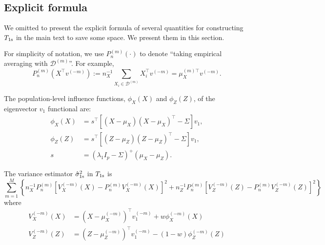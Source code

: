 \documentclass[11pt]{article}
\begin{document}
\subsection{Explicit formula}\label{app: explicit formula}

We omitted to present the explicit formula of several quantities for constructing $T_{\rm 1s}$ in the main text to save some space. We present them in this section.

For simplicity of notation, we use $P_n^{(m)}(\cdot)$ to denote ``taking empirical averaging with $\mathcal{D}^{(m)}$''. For example,
\begin{equation*}
    P_n^{(m)} (X^\top v^{(-m)}) := n_X^{-1}\sum_{X_i\in\mathcal{D}^{(m)}} X_i^\top v^{(-m)} = \mu_X^{(m)\top}v^{(-m)}.
\end{equation*}

The population-level influence functions, $\phi_X(X)$ and $\phi_Z(Z)$, of the eigenvector $v_1$ functional  are:
\begin{equation}\label{eq: define_true_influence}
    \begin{aligned}
\phi_X(X) & =s^{\top}\left[\left(X-\mu_X\right)\left(X-\mu_X \right)^{\top}-\Sigma \right] v_1 , \\
\phi_Z (Z) & =s^{ \top}\left[\left(Z-\mu_Z \right)\left(Z-\mu_Z \right)^{\top}-\Sigma \right] v_1 , \\
s  & =\left(\lambda_1 I_p-\Sigma \right)^{+}\left(\mu_X -\mu_Z \right) .
\end{aligned}
\end{equation}

The variance estimator $\hat{\sigma}_{\rm 1s}^2$ in $T_{\rm 1s}$ is 
\begin{equation}\label{eq:debiased test standard error}
        \sum_{m=1}^M\left\{n_X^{-1} P_n^{(m)}\left[V_X^{(-m)}(X)-P_n^{(m)} V_X^{(-m)}(X)\right]^2+n_Z^{-1} P_n^{(m)}\left[V_Z^{(-m)}(Z)-P_n^{(m)} V^{(-m)}_Z(Z)\right]^2\right\}   
\end{equation}
where
\begin{equation*}
    \begin{aligned}
        V_X^{(-m)}(X)& = \left(X-\mu_X^{(-m)}\right)^{\top} v_1^{(-m)}+w \phi_X^{(-m)}(X)\\
        V_Z^{(-m)}(Z)& =\left(Z-\mu_Z^{(-m)}\right)^{\top} v_1^{(-m)}-(1-w) \phi_Z^{(-m)}(Z)
    \end{aligned}
\end{equation*}
\end{document}
